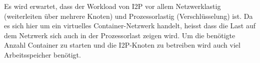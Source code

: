 Es wird erwartet, dass der Workload von I2P vor allem Netzwerklastig (weiterleiten über mehrere Knoten) und Prozessorlastig (Verschlüsselung) ist.
Da es sich hier um ein virtuelles Container-Netzwerk handelt, heisst dass die Last auf dem Netzwerk sich auch in der Prozessorlast zeigen wird.
Um die benötigte Anzahl Container zu starten und die I2P-Knoten zu betreiben wird auch viel Arbeitsspeicher benötigt.
